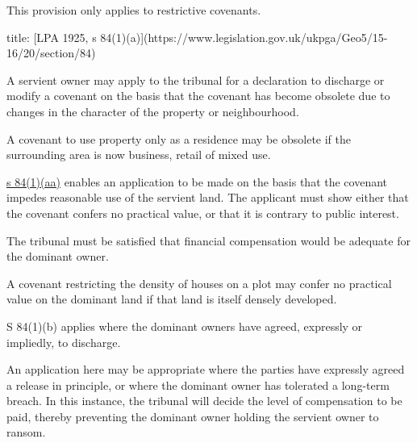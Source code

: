 \documentclass[
]{article}
\newenvironment{Shaded}{}{}
\newcommand{\NormalTok}[1]{#1}
\begin{document}
\begin{Shaded}
\begin{Highlighting}[]
\NormalTok{This provision only applies to restrictive covenants.}
\end{Highlighting}
\end{Shaded}

\begin{Shaded}
\begin{Highlighting}[]
\NormalTok{title: [LPA 1925, s 84(1)(a)](https://www.legislation.gov.uk/ukpga/Geo5/15{-}16/20/section/84)}

\NormalTok{A servient owner may apply to the tribunal for a declaration to discharge or modify a covenant on the basis that the covenant has become obsolete due to changes in the character of the property or neighbourhood.}
\end{Highlighting}
\end{Shaded}

\begin{Shaded}
\begin{Highlighting}[]
\NormalTok{A covenant to use property only as a residence may be obsolete if the surrounding area is now business, retail of mixed use.}
\end{Highlighting}
\end{Shaded}

\href{https://www.legislation.gov.uk/ukpga/Geo5/15-16/20/section/84}{s
84(1)(aa)} enables an application to be made on the basis that the
covenant impedes reasonable use of the servient land. The applicant must
show either that the covenant confers no practical value, or that it is
contrary to public interest.

The tribunal must be satisfied that financial compensation would be
adequate for the dominant owner.

\begin{Shaded}
\begin{Highlighting}[]
\NormalTok{A covenant restricting the density of houses on a plot may confer no practical value on the dominant land if that land is itself densely developed.}
\end{Highlighting}
\end{Shaded}

S 84(1)(b) applies where the dominant owners have agreed, expressly or
impliedly, to discharge.

\begin{Shaded}
\begin{Highlighting}[]
\NormalTok{An application here may be appropriate where the parties have expressly agreed a release in principle, or where the dominant owner has tolerated a long{-}term breach. In this instance, the tribunal will decide the level of compensation to be paid, thereby preventing the dominant owner holding the servient owner to ransom.}
\end{Highlighting}
\end{Shaded}
\end{document}
